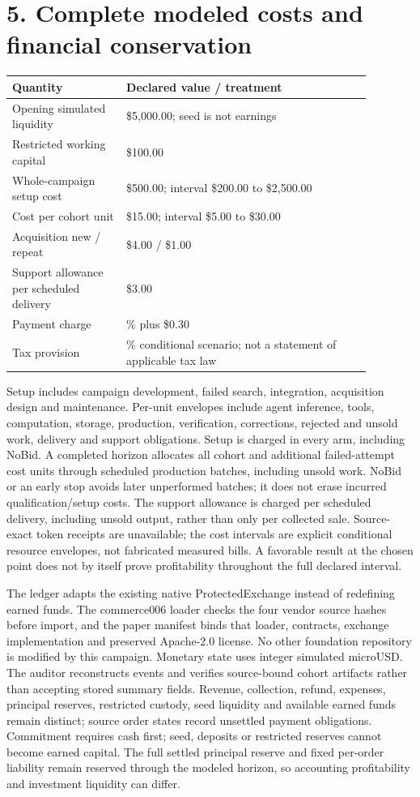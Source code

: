 \documentclass[10pt,letterpaper]{article}
\begin{document}
\section*{5. Complete modeled costs and financial conservation}
\begin{longtable}{>{\raggedright\arraybackslash}p{0.280\linewidth}>{\raggedright\arraybackslash}p{0.600\linewidth}}
\toprule
\textbf{Quantity} & \textbf{Declared value / treatment}\\
\midrule
\endhead
Opening simulated liquidity & \$5,000.00; seed is not earnings\\
Restricted working capital & \$100.00\\
Whole-campaign setup cost & \$500.00; interval \$200.00 to \$2,500.00\\
Cost per cohort unit & \$15.00; interval \$5.00 to \$30.00\\
Acquisition new / repeat & \$4.00 / \$1.00\\
Support allowance per scheduled delivery & \$3.00\\
Payment charge & 2.9\% plus \$0.30\\
Tax provision & 20.0\% conditional scenario; not a statement of applicable tax law\\
\bottomrule
\end{longtable}
Setup includes campaign development, failed search, integration, acquisition design and maintenance. Per-unit envelopes include agent inference, tools, computation, storage, production, verification, corrections, rejected and unsold work, delivery and support obligations. Setup is charged in every arm, including NoBid. A completed horizon allocates all cohort and additional failed-attempt cost units through scheduled production batches, including unsold work. NoBid or an early stop avoids later unperformed batches; it does not erase incurred qualification/setup costs. The support allowance is charged per scheduled delivery, including unsold output, rather than only per collected sale. Source-exact token receipts are unavailable; the cost intervals are explicit conditional resource envelopes, not fabricated measured bills. A favorable result at the chosen point does not by itself prove profitability throughout the full declared interval.

The ledger adapts the existing native ProtectedExchange instead of redefining earned funds. The commerce006 loader checks the four vendor source hashes before import, and the paper manifest binds that loader, contracts, exchange implementation and preserved Apache-2.0 license. No other foundation repository is modified by this campaign. Monetary state uses integer simulated microUSD. The auditor reconstructs events and verifies source-bound cohort artifacts rather than accepting stored summary fields. Revenue, collection, refund, expenses, principal reserves, restricted custody, seed liquidity and available earned funds remain distinct; source order states record unsettled payment obligations. Commitment requires cash first; seed, deposits or restricted reserves cannot become earned capital. The full settled principal reserve and fixed per-order liability remain reserved through the modeled horizon, so accounting profitability and investment liquidity can differ.
\end{document}
